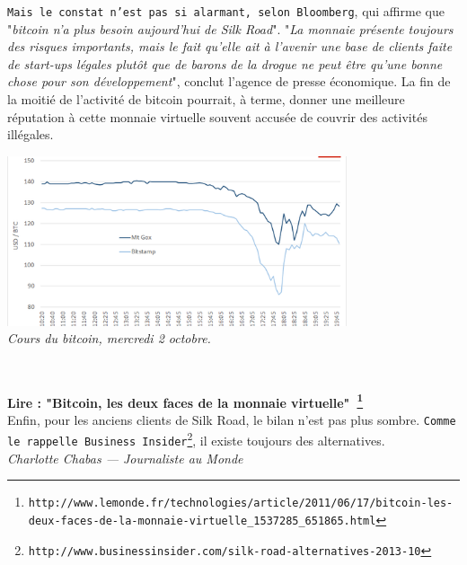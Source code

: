 \documentclass[11pt,twoside,a4paper]{article}
\begin{document}
\begin{minipage}[ht]{9.00cm}
	\texttt{Mais le constat n'est pas si alarmant, selon Bloomberg\footnotemark }, qui affirme que "\emph{bitcoin n'a plus besoin aujourd'hui de Silk Road}". "\emph{La monnaie pr{\'e}sente toujours des risques importants, mais le fait qu'elle ait {\`a} l'avenir une base de clients faite de start-ups l{\'e}gales plut{\^o}t que de barons de la drogue ne peut {\^e}tre qu'une bonne chose pour son d{\'e}veloppement}", conclut l'agence de presse {\'e}conomique. La fin de la moiti{\'e} de l'activit{\'e} de bitcoin pourrait, {\`a} terme, donner une meilleure r{\'e}putation {\`a} cette monnaie virtuelle souvent accus{\'e}e de couvrir des activit{\'e}s ill{\'e}gales. ~\\
\end{minipage} \hfill \begin{minipage}[ht]{10.25cm}
	\includegraphics[width=10.00cm]{img/3489413_3_02cf_cours-du-bitcoin-mercredi-2-octobre_f0f554e8ec06f798d5e2d9f90f9c56d1.png} ~\\
	\emph{Cours du bitcoin, mercredi 2 octobre.}~\\
\end{minipage} ~\\

\textbf{Lire : "Bitcoin, les deux faces de la monnaie virtuelle"~\footnote{\texttt{http://www.lemonde.fr/technologies/article/2011/06/17/bitcoin-les-deux-faces-de-la-monnaie-virtuelle\_1537285\_651865.html}} }~\\

Enfin, pour les anciens clients de Silk Road, le bilan n'est pas plus sombre. \texttt{Comme le rappelle Business Insider\footnote{\texttt{http://www.businessinsider.com/silk-road-alternatives-2013-10}}}, il existe toujours des alternatives. ~\\

\emph{Charlotte Chabas --- Journaliste au Monde}~\\ 
\end{document}
